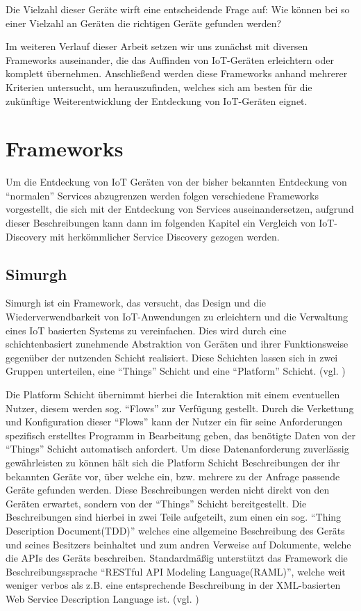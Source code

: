 \documentclass[conference,compsoc]{IEEEtran}
\begin{document}
Die Vielzahl dieser Geräte wirft eine entscheidende Frage auf: Wie können bei so einer Vielzahl an Geräten die richtigen Geräte gefunden werden?

Im weiteren Verlauf dieser Arbeit setzen wir uns zunächst mit diversen Frameworks auseinander, die das Auffinden von IoT-Geräten erleichtern oder komplett übernehmen. Anschließend werden diese Frameworks anhand mehrerer Kriterien untersucht, um herauszufinden, welches sich am besten für die zukünftige Weiterentwicklung der Entdeckung von IoT-Geräten eignet.

\section{Frameworks}
Um die Entdeckung von IoT Geräten von der bisher bekannten Entdeckung von \enquote{normalen} Services abzugrenzen werden folgen verschiedene Frameworks vorgestellt, die sich mit der Entdeckung von Services auseinandersetzen, aufgrund dieser Beschreibungen kann dann im folgenden Kapitel ein Vergleich von IoT-Discovery mit herkömmlicher Service Discovery gezogen werden.

\subsection{Simurgh}

Simurgh ist ein Framework, das versucht, das Design und die Wiederverwendbarkeit von IoT-Anwendungen zu erleichtern und die Verwaltung eines IoT basierten Systems zu vereinfachen. Dies wird  durch eine schichtenbasiert zunehmende Abstraktion von Geräten und ihrer Funktionsweise gegenüber der nutzenden Schicht realisiert. Diese Schichten lassen sich in zwei Gruppen unterteilen, eine \enquote{Things} Schicht und eine \enquote{Platform} Schicht. (vgl. \cite{simurgh})

Die Platform Schicht übernimmt hierbei die Interaktion mit einem eventuellen Nutzer, diesem werden sog. \enquote{Flows} zur Verfügung gestellt. Durch die Verkettung und Konfiguration dieser \enquote{Flows} kann der Nutzer ein für seine Anforderungen spezifisch erstelltes Programm in Bearbeitung geben, das benötigte Daten von der \enquote{Things} Schicht automatisch anfordert. Um diese Datenanforderung zuverlässig gewährleisten zu können hält sich die Platform Schicht Beschreibungen der ihr bekannten Geräte vor, über welche ein, bzw. mehrere zu der Anfrage passende Geräte gefunden werden. Diese Beschreibungen werden nicht direkt von den Geräten erwartet, sondern von der \enquote{Things} Schicht bereitgestellt. Die Beschreibungen sind hierbei in zwei Teile aufgeteilt, zum einen ein sog. \enquote{Thing Description Document(TDD)} welches eine allgemeine Beschreibung des Geräts und seines Besitzers beinhaltet und zum andren Verweise auf Dokumente, welche die APIs des Geräts beschreiben. Standardmäßig unterstützt das Framework die Beschreibungssprache \enquote{RESTful API Modeling Language(RAML)}, welche weit weniger verbos als z.B. eine entsprechende Beschreibung in der XML-basierten Web Service Description Language ist. (vgl. \cite{simurgh})
\end{document}
